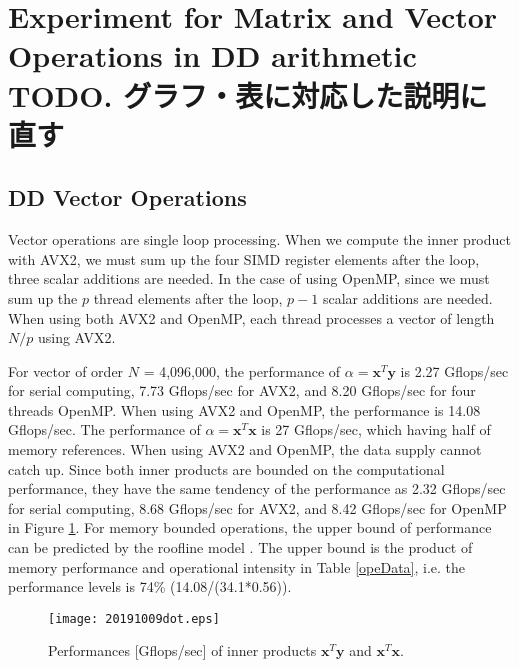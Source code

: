 \documentclass{IOS-Book-Article}
\begin{document}
\section{Experiment for Matrix and Vector Operations in DD arithmetic TODO. グラフ・表に対応した説明に直す}
\subsection{DD Vector Operations}
Vector operations are single loop processing. 
When we compute the inner product with AVX2, we must sum up the four SIMD register elements after the loop, three scalar additions are needed.
In the case of using OpenMP, since we must sum up the $p$ thread elements after the loop, $p-1$ scalar additions are needed.
When using both AVX2 and OpenMP, each thread processes a vector of length $N/p$ using AVX2.

For vector of order $N$ = 4,096,000, the performance of $\alpha  = \bm{x}^T\bm{y}$ is 2.27 Gflops/sec for serial computing, 7.73 Gflops/sec for AVX2, and 8.20 Gflops/sec for four threads OpenMP. When using AVX2 and OpenMP, the performance is 14.08 Gflops/sec.
The performance of $\alpha = \bm{x}^T\bm{x}$ is 27 Gflops/sec, which having half of memory references. 
When using AVX2 and OpenMP, the data supply cannot catch up. 
Since both inner products are bounded on the computational performance, they have the same tendency of the performance as 2.32 Gflops/sec for serial computing, 8.68 Gflops/sec for AVX2, and 8.42 Gflops/sec for OpenMP in Figure \ref{xdot}.
For memory bounded operations, the upper bound of performance can be predicted by the roofline model \cite{roof}. The upper bound is the product of memory performance and operational intensity in Table \ref{opeData}, i.e. the performance levels is 74\% (14.08/(34.1*0.56)). 

\begin{figure}[htbp]
  \begin{center}
    \texttt{[image: 20191009dot.eps]}
    \caption{Performances [Gflops/sec] of inner products $\bm{x}^T\bm{y}$ and $\bm{x}^T\bm{x}$.}
    \label{xdot}
  \end{center}
\end{figure}
\end{document}
